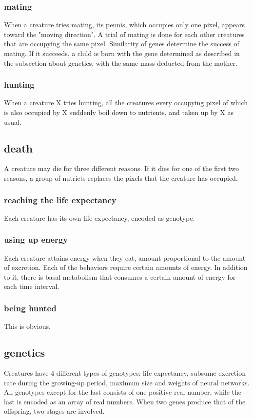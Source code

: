 \documentclass{amsart}
\theoremstyle{definition}
\theoremstyle{remark}
\numberwithin{equation}{section}
\begin{document}
\subsubsection{mating}
When a creature tries mating, its pennis, which occupies only one pixel, appears toward the "moving direction". A trial of mating is done for each other creatures that are occupying the same pixel. Similarity of genes determine the success of mating. If it succeeds, a child is born with the gene determined as described in the subsection about genetics, with the same mass deducted from the mother.
\subsubsection{hunting}
When a creature X tries hunting, all the creatures every occupying pixel of which is also occupied by X suddenly boil down to nutrients, and taken up by X as usual.
\subsection{death}
A creature may die for three different reasons. 
If it dies for one of the first two reasons, a group of nutriets replaces the pixels that the creature has occupied. 
\subsubsection{reaching the life expectancy}
Each creature has its own life expectancy, encoded as genotype.
\subsubsection{using up energy}
Each creature attains energy when they eat, amount proportional to the amount of excretion. Each of the behaviors require certain amounts of energy. In addition to it, there is basal metabolism that consumes a certain amount of energy for each time interval. 
\subsubsection{being hunted}
This is obvious. 

\subsection{genetics}
Creatures have 4 different types of genotypes: life expectancy, subsume-excretion rate during the growing-up period, maximum size and weights of neural networks. All genotypes except for the last consists of one positive real number, while the last is encoded as an array of real numbers. When two genes produce that of the offspring, two stages are involved.
\end{document}
